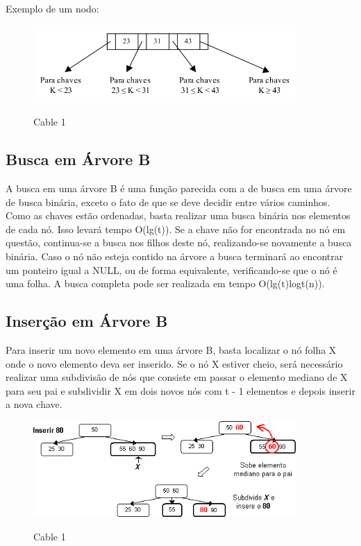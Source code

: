 \documentclass{article}
\begin{document}
Exemplo de um nodo:

\begin{figure}[h]
    \center
    \includegraphics[width=10cm]{imagens/arvb1.png}
    \label{cable}
    \caption{Cable 1}
\end{figure}

\newpage

\subsection{Busca em Árvore B}

A busca em uma árvore B é uma função parecida com a de busca em uma árvore de busca binária, exceto
o fato de que se deve decidir entre vários caminhos. Como as chaves estão ordenadas, basta realizar
uma busca binária nos elementos de cada nó. Isso levará tempo O(lg(t)). Se a chave não for
encontrada no nó em questão, continua-se a busca nos filhos deste nó, realizando-se novamente a
busca binária. Caso o nó não esteja contido na árvore a busca terminará ao encontrar um ponteiro
igual a NULL, ou de forma equivalente, verificando-se que o nó é uma folha. A busca completa pode
ser realizada em tempo O(lg(t)logt(n)).

\subsection{Inserção em Árvore B}

Para inserir um novo elemento em uma árvore B, basta localizar o nó folha X onde o novo elemento
deva ser inserido. Se o nó X estiver cheio, será necessário realizar uma subdivisão de nós que
consiste em passar o elemento mediano de X para seu pai e subdividir X em dois novos nós com t - 1
elementos e depois inserir a nova chave.

\begin{figure}[h]
    \center
    \includegraphics[width=10cm]{imagens/arvb3.png}
    \label{cable}
    \caption{Cable 1}
\end{figure}
\end{document}
